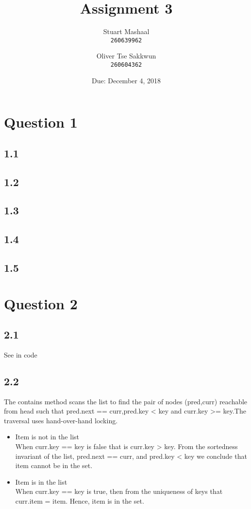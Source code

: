 \documentclass[11pt, letterpaper]{article}
\title{Assignment 3}
\author{
    Stuart Mashaal\\
    \texttt{260639962}
    \and
    Oliver Tse Sakkwun\\
    \texttt{260604362}
}
\date{Due: December 4, 2018}
\begin{document}
\begin{titlepage}
    \maketitle
    \thispagestyle{empty}
    \setcounter{page}{0}
\end{titlepage}

\section*{Question 1}
\label{sec:question_1}

\subsection*{1.1}
\label{sub:1_1}

\subsection*{1.2}
\label{sub:1_2}

\subsection*{1.3}
\label{sub:1_3}

\subsection*{1.4}
\label{sub:1_4}

\subsection*{1.5}
\label{sub:1_5}

\section*{Question 2}
\subsection*{2.1}
See in code
\subsection*{2.2}
The contains method scans the list to find the pair of nodes (pred,curr) reachable from head such that 
pred.next == curr,pred.key < key and curr.key >= key.The traversal uses hand-over-hand locking.
\begin{itemize}
\item Item is not in the list \\
When curr.key == key is false that is curr.key > key. From the sortedness 
invariant of the list, pred.next == curr, and pred.key < key we conclude that item cannot be in the 
set.

 \item Item is in the list \\
When curr.key == key is true, then from the uniqueness of keys that curr.item = item. Hence, item is in the set.
\end{itemize}
\end{document}
